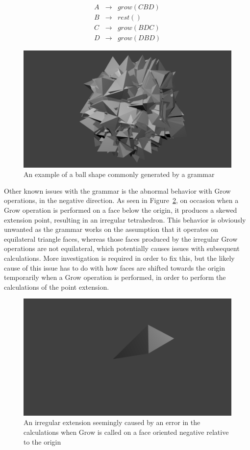 \documentclass[condensed]{union-cs-thesis}
\begin{document}
\begin{displaymath}
  \begin{matrix}
    A & \to & grow(CBD)  \\
    B & \to & rest()     \\
    C & \to & grow(BDC)  \\
    D & \to & grow(DBD)
  \end{matrix}
\end{displaymath}

\begin{figure}[h]
  \centering
  \includegraphics[width=.66\textwidth]{ball-grammar}
  \caption{An example of a ball shape commonly generated by a grammar}
  \label{fig:ball-gram}
\end{figure}

\par
Other known issues with the grammar is the abnormal behavior with Grow operations, in the negative direction.  As seen in Figure~\ref{fig:skewed-pyr}, on occasion when a Grow operation is performed on a face below the origin, it produces a skewed extension point, resulting in an irregular tetrahedron.  This behavior is obviously unwanted as the grammar works on the assumption that it operates on equilateral triangle faces, whereas those faces produced by the irregular Grow operations are not equilateral, which potentially causes issues with subsequent calculations.  More investigation is required in order to fix this, but the likely cause of this issue has to do with how faces are shifted towards the origin temporarily when a Grow operation is performed, in order to perform the calculations of the point extension.

\begin{figure}[h]
  \centering
  \includegraphics[width=.66\textwidth]{skewed-faces}
  \caption{An irregular extension seemingly caused by an error in the calculations when Grow is called on a face oriented negative relative to the origin}
  \label{fig:skewed-pyr}
\end{figure}
\end{document}
